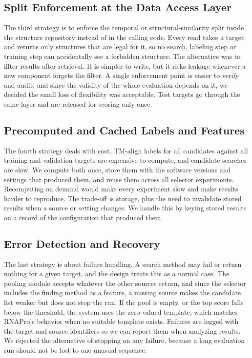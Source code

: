 \documentclass{FastFyp}
\begin{document}
\subsection{Split Enforcement at the Data Access Layer}
The third strategy is to enforce the temporal or structural-similarity split inside the structure repository instead of in the calling code. Every read takes a target and returns only structures that are legal for it, so no search, labeling step or training step can accidentally see a forbidden structure. The alternative was to filter results after retrieval. It is simpler to write, but it risks leakage whenever a new component forgets the filter. A single enforcement point is easier to verify and audit, and since the validity of the whole evaluation depends on it, we decided the small loss of flexibility was acceptable. Test targets go through the same layer and are released for scoring only once.

\subsection{Precomputed and Cached Labels and Features}
The fourth strategy deals with cost. TM-align labels for all candidates against all training and validation targets are expensive to compute, and candidate searches are slow. We compute both once, store them with the software versions and settings that produced them, and reuse them across all selector experiments. Recomputing on demand would make every experiment slow and make results harder to reproduce. The trade-off is storage, plus the need to invalidate stored results when a source or setting changes. We handle this by keying stored results on a record of the configuration that produced them.

\subsection{Error Detection and Recovery}
The last strategy is about failure handling. A search method may fail or return nothing for a given target, and the design treats this as a normal case. The pooling module accepts whatever the other sources return, and since the selector includes the finding method as a feature, a missing source makes the candidate list weaker but does not stop the run. If the pool is empty, or the top score falls below the threshold, the system uses the zero-valued template, which matches RNAPro's behavior when no suitable template exists. Failures are logged with the target and source identifiers so we can report them when analyzing results. We rejected the alternative of stopping on any failure, because a long evaluation run should not be lost to one unusual sequence.
\end{document}
